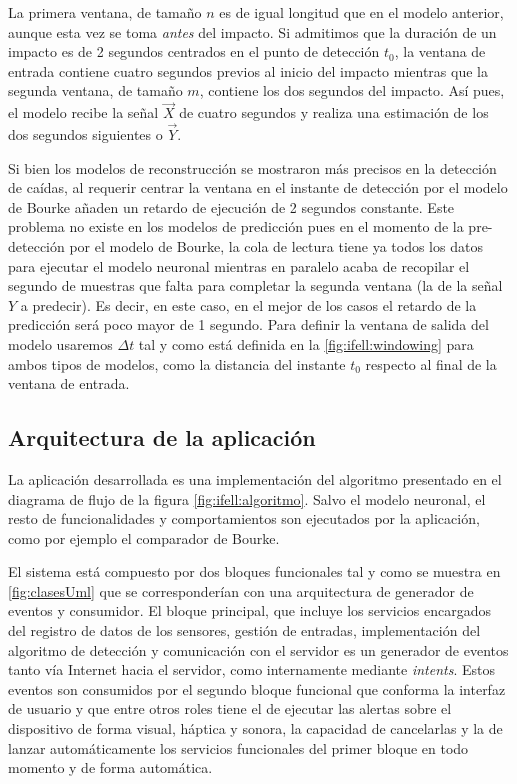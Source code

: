La primera ventana, de tamaño $n$ es de igual longitud que en el modelo anterior, aunque esta vez se toma \emph{antes} del impacto. Si admitimos que la duración de un impacto es de 2 segundos centrados en el punto de detección $t_0$, la ventana de entrada contiene cuatro segundos previos al inicio del impacto mientras que la segunda ventana, de tamaño $m$, contiene los dos segundos del impacto. Así pues, el modelo recibe la señal $\vec{X}$ de cuatro segundos y realiza una estimación de los dos segundos siguientes o $\vec{Y}$.

Si bien los modelos de reconstrucción se mostraron más precisos en la detección de caídas, al requerir centrar la ventana en el instante de detección por el modelo de Bourke añaden un retardo de ejecución de 2 segundos constante. Este problema no existe en los modelos de predicción pues en el momento de la pre-detección por el modelo de Bourke, la cola de lectura tiene ya todos los datos para ejecutar el modelo neuronal mientras en paralelo acaba de recopilar el segundo de muestras que falta para completar la segunda ventana (la de la señal $Y$ a predecir). Es decir, en este caso, en el mejor de los casos el retardo de la predicción será poco mayor de 1 segundo. Para definir la ventana de salida del modelo usaremos $\Delta t$ tal y como está definida en la \autoref{fig:ifell:windowing} para ambos tipos de modelos, como la distancia del instante $t_0$ respecto al final de la ventana de entrada. 


\subsection{Arquitectura de la aplicación}

La aplicación desarrollada es una implementación del algoritmo presentado en el diagrama de flujo de la figura \ref{fig:ifell:algoritmo}. Salvo el modelo neuronal, el resto de funcionalidades y comportamientos son ejecutados por la aplicación, como por ejemplo el comparador de Bourke.

El sistema está compuesto por dos bloques funcionales tal y como se muestra en \ref{fig:clasesUml} que se corresponderían con una arquitectura de generador de eventos y consumidor. El bloque principal, que incluye los servicios encargados del registro de datos de los sensores, gestión de entradas, implementación del algoritmo de detección y comunicación con el servidor es un generador de eventos tanto vía Internet hacia el servidor, como internamente mediante \textit{intents}. Estos eventos son consumidos por el segundo bloque funcional que conforma la interfaz de usuario y que entre otros roles tiene el de ejecutar las alertas sobre el dispositivo de forma visual, háptica y sonora, la capacidad de cancelarlas y la de lanzar automáticamente los servicios funcionales del primer bloque en todo momento y de forma automática.

